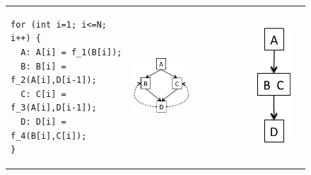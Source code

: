 \documentclass[sigconf, screen, natbib=false, dvipsnames, table]{acmart}
\theoremstyle{definition}
\begin{document}
\begin{figure}[tbhp]
\begin{tabular}{llll}
\begin{minipage}[b]{4.25cm}

\begin{verbatim}
for (int i=1; i<=N; i++) {
  A: A[i] = f_1(B[i]);
  B: B[i] = f_2(A[i],D[i-1]);
  C: C[i] = f_3(A[i],D[i-1]);
  D: D[i] = f_4(B[i],C[i]);
}
\end{verbatim}
\end{minipage} 

&

\begin{minipage}[b]{4.25cm}
\includegraphics[width=0.5\textwidth]{figs/dependenceGraph.pdf}
\end{minipage}


&

\begin{minipage}[b]{4.25cm}
\includegraphics[height=0.15\textheight]{figs/MPCloop.pdf}
\end{minipage}


\end{tabular}
\end{figure}
\end{document}
